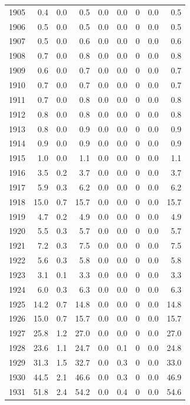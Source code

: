 \documentclass[12pt,]{article}
\begin{document}
\begin{longtable}{rrrrrrrrr}
  1905 & 0.4 & 0.0 & 0.5 & 0.0 & 0.0 & 0 & 0.0 & 0.5 \\ 
  1906 & 0.5 & 0.0 & 0.5 & 0.0 & 0.0 & 0 & 0.0 & 0.5 \\ 
  1907 & 0.5 & 0.0 & 0.6 & 0.0 & 0.0 & 0 & 0.0 & 0.6 \\ 
  1908 & 0.7 & 0.0 & 0.8 & 0.0 & 0.0 & 0 & 0.0 & 0.8 \\ 
  1909 & 0.6 & 0.0 & 0.7 & 0.0 & 0.0 & 0 & 0.0 & 0.7 \\ 
  1910 & 0.7 & 0.0 & 0.7 & 0.0 & 0.0 & 0 & 0.0 & 0.7 \\ 
  1911 & 0.7 & 0.0 & 0.8 & 0.0 & 0.0 & 0 & 0.0 & 0.8 \\ 
  1912 & 0.8 & 0.0 & 0.8 & 0.0 & 0.0 & 0 & 0.0 & 0.8 \\ 
  1913 & 0.8 & 0.0 & 0.9 & 0.0 & 0.0 & 0 & 0.0 & 0.9 \\ 
  1914 & 0.9 & 0.0 & 0.9 & 0.0 & 0.0 & 0 & 0.0 & 0.9 \\ 
  1915 & 1.0 & 0.0 & 1.1 & 0.0 & 0.0 & 0 & 0.0 & 1.1 \\ 
  1916 & 3.5 & 0.2 & 3.7 & 0.0 & 0.0 & 0 & 0.0 & 3.7 \\ 
  1917 & 5.9 & 0.3 & 6.2 & 0.0 & 0.0 & 0 & 0.0 & 6.2 \\ 
  1918 & 15.0 & 0.7 & 15.7 & 0.0 & 0.0 & 0 & 0.0 & 15.7 \\ 
  1919 & 4.7 & 0.2 & 4.9 & 0.0 & 0.0 & 0 & 0.0 & 4.9 \\ 
  1920 & 5.5 & 0.3 & 5.7 & 0.0 & 0.0 & 0 & 0.0 & 5.7 \\ 
  1921 & 7.2 & 0.3 & 7.5 & 0.0 & 0.0 & 0 & 0.0 & 7.5 \\ 
  1922 & 5.6 & 0.3 & 5.8 & 0.0 & 0.0 & 0 & 0.0 & 5.8 \\ 
  1923 & 3.1 & 0.1 & 3.3 & 0.0 & 0.0 & 0 & 0.0 & 3.3 \\ 
  1924 & 6.0 & 0.3 & 6.3 & 0.0 & 0.0 & 0 & 0.0 & 6.3 \\ 
  1925 & 14.2 & 0.7 & 14.8 & 0.0 & 0.0 & 0 & 0.0 & 14.8 \\ 
  1926 & 15.0 & 0.7 & 15.7 & 0.0 & 0.0 & 0 & 0.0 & 15.7 \\ 
  1927 & 25.8 & 1.2 & 27.0 & 0.0 & 0.0 & 0 & 0.0 & 27.0 \\ 
  1928 & 23.6 & 1.1 & 24.7 & 0.0 & 0.1 & 0 & 0.0 & 24.8 \\ 
  1929 & 31.3 & 1.5 & 32.7 & 0.0 & 0.3 & 0 & 0.0 & 33.0 \\ 
  1930 & 44.5 & 2.1 & 46.6 & 0.0 & 0.3 & 0 & 0.0 & 46.9 \\ 
  1931 & 51.8 & 2.4 & 54.2 & 0.0 & 0.4 & 0 & 0.0 & 54.6 \\ 

\end{longtable}
\end{document}
